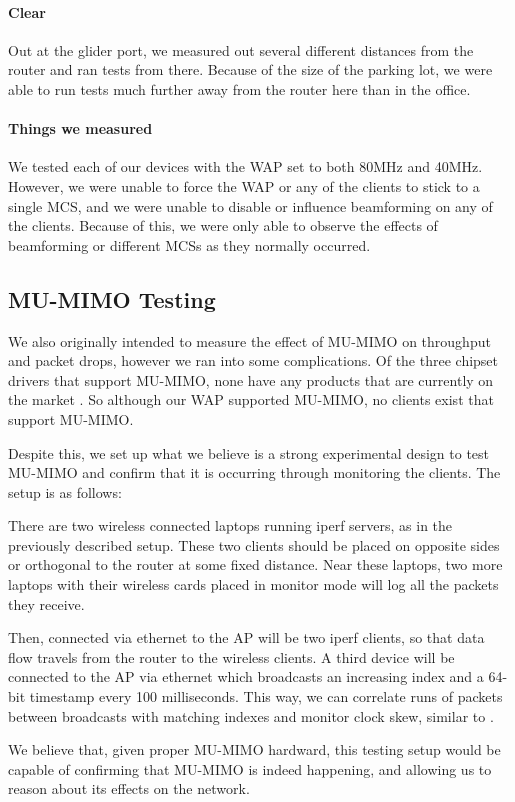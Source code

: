\paragraph{Clear}
Out at the glider port, we measured out several different distances from the
router and ran tests from there. Because of the size of the parking lot, we were
able to run tests much further away from the router here than in the office.

\paragraph{  Things we measured }
We tested each of our devices with the WAP set to both 80MHz and 40MHz.
However, we were unable to force the WAP or any of the clients to stick to a
single MCS, and we were unable to disable or influence beamforming on any of the
clients. Because of this, we were only able to observe the effects of
beamforming or different MCSs as they normally occurred.


\subsection{MU-MIMO Testing}

We also originally intended to measure the effect of MU-MIMO on throughput and
packet drops, however we ran into some complications. Of the three chipset
drivers that support MU-MIMO, none have any products that are currently on the
market . So although our WAP supported
MU-MIMO, no clients exist that support MU-MIMO.

Despite this, we set up what we believe is a strong experimental design to test
MU-MIMO and confirm that it is occurring through monitoring the clients. The
setup is as follows:

There are two wireless connected laptops running iperf servers, as in the
previously described setup. These two clients should be placed on opposite sides
or orthogonal to the router at some fixed distance. Near these laptops, two more
laptops with their wireless cards placed in monitor mode will log all the
packets they receive.

Then, connected via ethernet to the AP will be two iperf clients, so that data
flow travels from the router to the wireless clients. A third device will be
connected to the AP via ethernet which broadcasts an increasing index and a
64-bit timestamp every 100 milliseconds. This way, we can correlate runs of
packets between broadcasts with matching indexes and monitor clock skew, similar
to .

We believe that, given proper MU-MIMO hardward, this testing setup would be
capable of confirming that MU-MIMO is indeed happening, and allowing us to
reason about its effects on the network.



